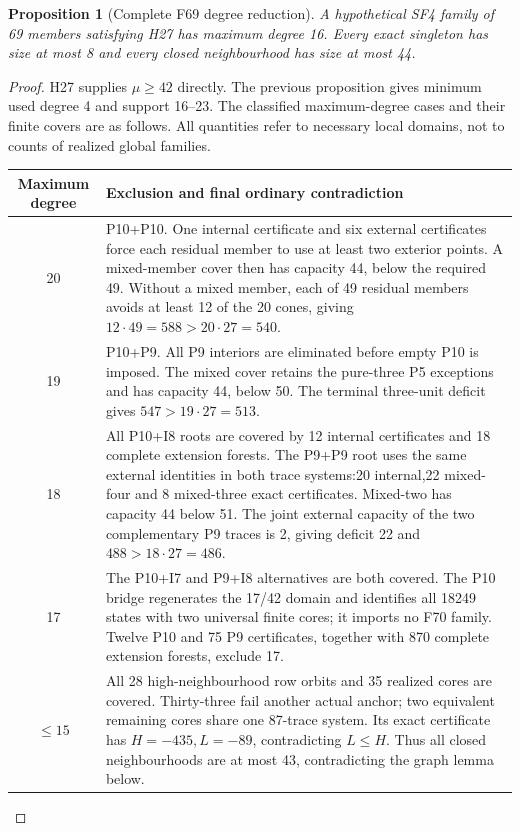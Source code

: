 \documentclass[11pt,a4paper]{article}
\numberwithin{equation}{section}
\newtheorem{proposition}[theorem]{Proposition}
\theoremstyle{remark}
\begin{document}
\begin{proposition}[Complete F69 degree reduction]\label{prop:f69reduction}
A hypothetical SF4 family of 69 members satisfying H27 has maximum degree 16.
Every exact singleton has size at most 8 and every closed neighbourhood
has size at most 44.
\end{proposition}
\begin{proof}
H27 supplies $\mu\ge 42$ directly. The previous proposition gives minimum
used degree 4 and support 16--23. The classified maximum-degree cases and
their finite covers are as follows. All quantities refer to necessary
local domains, not to counts of realized global families.
\begin{center}\small
\begin{tabular}{c p{9.5cm}}\toprule
Maximum degree&Exclusion and final ordinary contradiction\\\midrule
20&P10+P10. One internal certificate and six external certificates force
each residual member to use at least two exterior points. A mixed-member
cover then has capacity 44, below the required 49. Without a mixed member,
each of 49 residual members avoids at least 12 of the 20 cones, giving
$12\cdot 49=588>20\cdot 27=540$.\\
19&P10+P9. All P9 interiors are eliminated before empty P10 is imposed.
The mixed cover retains the pure-three P5 exceptions and has capacity 44,
below 50. The terminal three-unit deficit gives $547>19\cdot 27=513$.\\
18&All P10+I8 roots are covered by 12 internal certificates and 18 complete
extension forests. The P9+P9 root uses the same external identities in
both trace systems:20 internal,22 mixed-four and 8 mixed-three exact
certificates. Mixed-two has capacity 44 below 51. The joint external
capacity of the two complementary P9 traces is 2, giving deficit 22 and
$488>18\cdot 27=486$.\\
17&The P10+I7 and P9+I8 alternatives are both covered. The P10 bridge
regenerates the 17/42 domain and identifies all 18249 states with two
universal finite cores; it imports no F70 family. Twelve P10 and 75 P9
certificates, together with 870 complete extension forests, exclude 17.\\
$\le 15$&All 28 high-neighbourhood row orbits and 35 realized cores are covered.
Thirty-three fail another actual anchor; two equivalent remaining cores
share one 87-trace system. Its exact certificate has $ H=-435,L=-89$,
contradicting $ L\le H $. Thus all closed neighbourhoods are at most 43,
contradicting the graph lemma below.\\\bottomrule

\end{tabular}
\end{center}
\end{proof}
\end{document}
